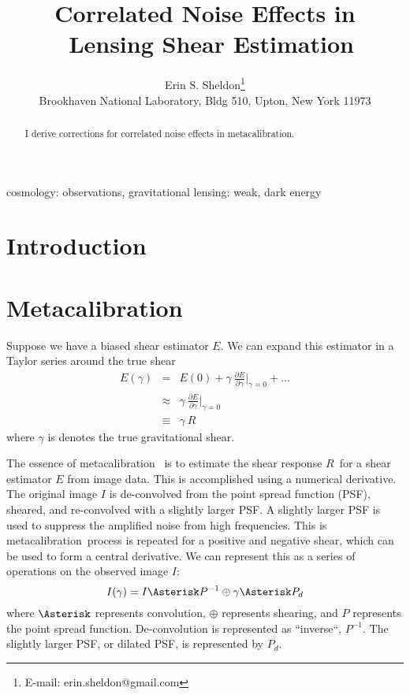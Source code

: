 \documentclass[usegraphicx,usenatbib]{mn2e}
\title{Correlated Noise Effects in \Mcal\ Lensing Shear Estimation}
\author[Erin S. Sheldon]{Erin S. Sheldon\thanks{E-mail: erin.sheldon@gmail.com}\\
Brookhaven National Laboratory, Bldg 510, Upton, New York 11973}
\newcommand{\mcal}{metacalibration}
\newcommand{\Mcal}{Metacalibration}
\newcommand{\mcalR}{$R$}
\begin{document}
\maketitle

\begin{abstract}

I derive corrections for correlated noise effects in \mcal.   

\end{abstract}


\begin{keywords}                                                                    
    cosmology: observations,
    gravitational lensing: weak,
    dark energy
\end{keywords} 

\section{Introduction} \label{sec:intro}

\section{\Mcal} \label{sec:algo}

Suppose we have a biased shear estimator $E$.  We can expand this estimator
in a Taylor series around the true shear
\begin{eqnarray}
    E(\gamma) & = & E(0) + \gamma ~ \frac{ \partial E }{ \partial \gamma }\bigg|_{\gamma=0}  + ... \nonumber \\
      & \approx & \gamma ~ \frac{ \partial E }{ \partial \gamma } \bigg|_{\gamma=0}  \\
      & \equiv & \gamma ~ R \nonumber
\end{eqnarray}
where $\gamma$ is denotes the true gravitational shear.

The essence of \mcal\ \citep{HuffMcal} is to estimate the shear response
\mcalR\ for a shear estimator $E$ from image data.  This is accomplished using
a numerical derivative.  The original image $I$ is de-convolved from the point
spread function (PSF), sheared, and re-convolved with a slightly larger PSF.  A
slightly larger PSF is used to suppress the amplified noise from high
frequencies.  This is \mcal\ process is repeated for a positive and negative
shear, which can be used to form a central derivative.  We can represent this
as a series of operations on the observed image $I$:
\begin{equation}
    I(\gamma) = I \Asterisk P^{-1} \oplus \gamma \Asterisk P_{d}
\end{equation}
where $\Asterisk$ represents convolution, $\oplus$ represents shearing,
and $P$ represents the point spread function.  De-convolution
is represented as ``inverse``, $P^{-1}$.  The slightly larger PSF, or
dilated PSF, is represented by $P_{d}$.
\end{document}
